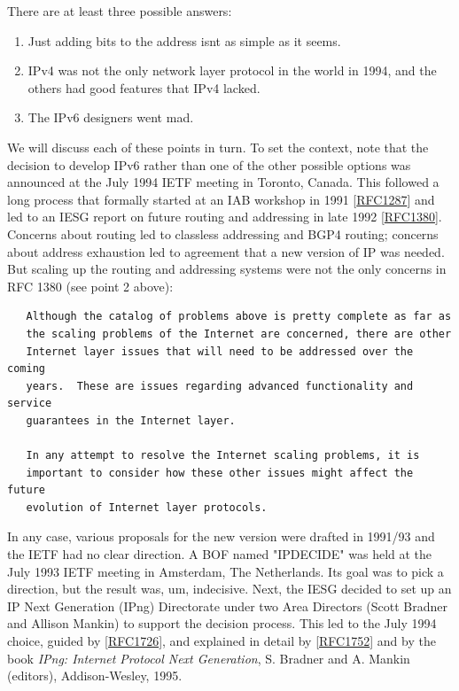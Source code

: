 \documentclass[
]{article}
\begin{document}
There are at least three possible answers:

\begin{enumerate}
\def\labelenumi{\arabic{enumi}.}
\item
  Just adding bits to the address isn\textquotesingle t as simple as it
  seems.
\item
  IPv4 was not the only network layer protocol in the world in 1994, and
  the others had good features that IPv4 lacked.
\item
  The IPv6 designers went mad.
\end{enumerate}

We will discuss each of these points in turn. To set the context, note
that the decision to develop IPv6 rather than one of the other possible
options was announced at the July 1994 IETF meeting in Toronto, Canada.
This followed a long process that formally started at an IAB workshop in
1991 {[}\href{https://www.rfc-editor.org/info/rfc1287}{RFC1287}{]} and
led to an IESG report on future routing and addressing in late 1992
{[}\href{https://www.rfc-editor.org/info/rfc1380}{RFC1380}{]}. Concerns
about routing led to classless addressing and BGP4 routing; concerns
about address exhaustion led to agreement that a new version of IP was
needed. But scaling up the routing and addressing systems were not the
only concerns in RFC 1380 (see point 2 above):

\begin{verbatim}
   Although the catalog of problems above is pretty complete as far as
   the scaling problems of the Internet are concerned, there are other
   Internet layer issues that will need to be addressed over the coming
   years.  These are issues regarding advanced functionality and service
   guarantees in the Internet layer.
 
   In any attempt to resolve the Internet scaling problems, it is
   important to consider how these other issues might affect the future
   evolution of Internet layer protocols.
\end{verbatim}

In any case, various proposals for the new version were drafted in
1991/93 and the IETF had no clear direction. A BOF named "IPDECIDE" was
held at the July 1993 IETF meeting in Amsterdam, The Netherlands. Its
goal was to pick a direction, but the result was, um, indecisive. Next,
the IESG decided to set up an IP Next Generation (IPng) Directorate
under two Area Directors (Scott Bradner and Allison Mankin) to support
the decision process. This led to the July 1994 choice, guided by
{[}\href{https://www.rfc-editor.org/info/rfc1726}{RFC1726}{]}, and
explained in detail by
{[}\href{https://www.rfc-editor.org/info/rfc1752}{RFC1752}{]} and by the
book \emph{IPng: Internet Protocol Next Generation}, S. Bradner and A.
Mankin (editors), Addison-Wesley, 1995.
\end{document}
